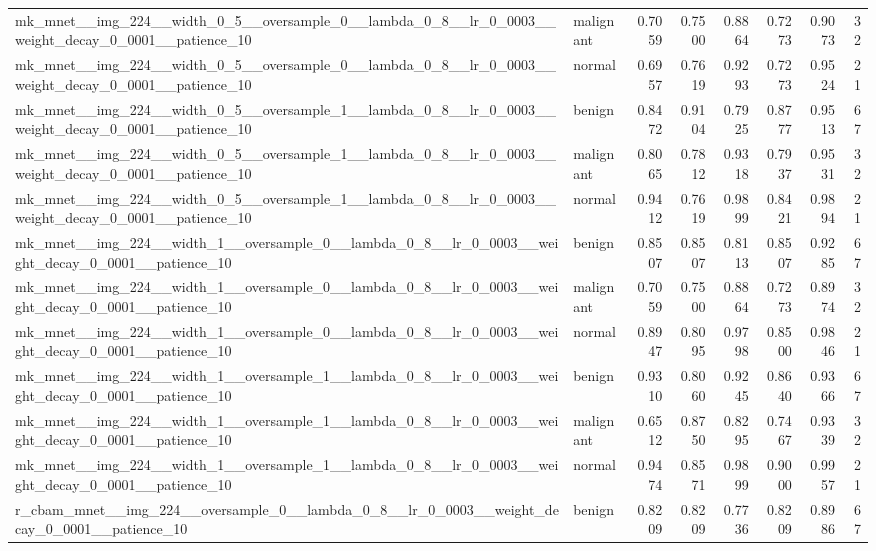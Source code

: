 \begin{longtable}{p{4.2cm}lrrrrrr}
mk\_mnet\_\_img\_224\_\_width\_0\_5\_\_oversample\_0\_\_lambda\_0\_8\_\_lr\_0\_0003\_\_weight\_decay\_0\_0001\_\_patience\_10 & malignant & 0.7059 & 0.7500 & 0.8864 & 0.7273 & 0.9073 & 32 \\
mk\_mnet\_\_img\_224\_\_width\_0\_5\_\_oversample\_0\_\_lambda\_0\_8\_\_lr\_0\_0003\_\_weight\_decay\_0\_0001\_\_patience\_10 & normal & 0.6957 & 0.7619 & 0.9293 & 0.7273 & 0.9524 & 21 \\
mk\_mnet\_\_img\_224\_\_width\_0\_5\_\_oversample\_1\_\_lambda\_0\_8\_\_lr\_0\_0003\_\_weight\_decay\_0\_0001\_\_patience\_10 & benign & 0.8472 & 0.9104 & 0.7925 & 0.8777 & 0.9513 & 67 \\
mk\_mnet\_\_img\_224\_\_width\_0\_5\_\_oversample\_1\_\_lambda\_0\_8\_\_lr\_0\_0003\_\_weight\_decay\_0\_0001\_\_patience\_10 & malignant & 0.8065 & 0.7812 & 0.9318 & 0.7937 & 0.9531 & 32 \\
mk\_mnet\_\_img\_224\_\_width\_0\_5\_\_oversample\_1\_\_lambda\_0\_8\_\_lr\_0\_0003\_\_weight\_decay\_0\_0001\_\_patience\_10 & normal & 0.9412 & 0.7619 & 0.9899 & 0.8421 & 0.9894 & 21 \\
mk\_mnet\_\_img\_224\_\_width\_1\_\_oversample\_0\_\_lambda\_0\_8\_\_lr\_0\_0003\_\_weight\_decay\_0\_0001\_\_patience\_10 & benign & 0.8507 & 0.8507 & 0.8113 & 0.8507 & 0.9285 & 67 \\
mk\_mnet\_\_img\_224\_\_width\_1\_\_oversample\_0\_\_lambda\_0\_8\_\_lr\_0\_0003\_\_weight\_decay\_0\_0001\_\_patience\_10 & malignant & 0.7059 & 0.7500 & 0.8864 & 0.7273 & 0.8974 & 32 \\
mk\_mnet\_\_img\_224\_\_width\_1\_\_oversample\_0\_\_lambda\_0\_8\_\_lr\_0\_0003\_\_weight\_decay\_0\_0001\_\_patience\_10 & normal & 0.8947 & 0.8095 & 0.9798 & 0.8500 & 0.9846 & 21 \\
mk\_mnet\_\_img\_224\_\_width\_1\_\_oversample\_1\_\_lambda\_0\_8\_\_lr\_0\_0003\_\_weight\_decay\_0\_0001\_\_patience\_10 & benign & 0.9310 & 0.8060 & 0.9245 & 0.8640 & 0.9366 & 67 \\
mk\_mnet\_\_img\_224\_\_width\_1\_\_oversample\_1\_\_lambda\_0\_8\_\_lr\_0\_0003\_\_weight\_decay\_0\_0001\_\_patience\_10 & malignant & 0.6512 & 0.8750 & 0.8295 & 0.7467 & 0.9339 & 32 \\
mk\_mnet\_\_img\_224\_\_width\_1\_\_oversample\_1\_\_lambda\_0\_8\_\_lr\_0\_0003\_\_weight\_decay\_0\_0001\_\_patience\_10 & normal & 0.9474 & 0.8571 & 0.9899 & 0.9000 & 0.9957 & 21 \\
r\_cbam\_mnet\_\_img\_224\_\_oversample\_0\_\_lambda\_0\_8\_\_lr\_0\_0003\_\_weight\_decay\_0\_0001\_\_patience\_10 & benign & 0.8209 & 0.8209 & 0.7736 & 0.8209 & 0.8986 & 67 \\

\end{longtable}
